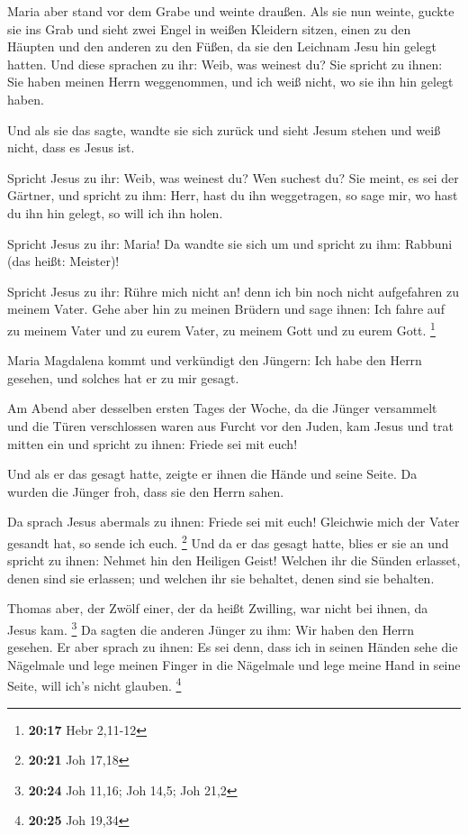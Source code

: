  Maria aber stand vor dem Grabe und weinte draußen. Als
sie nun weinte, guckte sie ins Grab  und sieht zwei Engel
in weißen Kleidern sitzen, einen zu den Häupten und den anderen zu den
Füßen, da sie den Leichnam Jesu hin gelegt hatten.  Und
diese sprachen zu ihr: Weib, was weinest du? Sie spricht zu ihnen: Sie
haben meinen Herrn weggenommen, und ich weiß nicht, wo sie ihn hin
gelegt haben.

 Und als sie das sagte, wandte sie sich zurück und sieht
Jesum stehen und weiß nicht, dass es Jesus ist.

 Spricht Jesus zu ihr: Weib, was weinest du? Wen suchest
du? Sie meint, es sei der Gärtner, und spricht zu ihm: Herr, hast du ihn
weggetragen, so sage mir, wo hast du ihn hin gelegt, so will ich ihn
holen.

 Spricht Jesus zu ihr: Maria! Da wandte sie sich um und
spricht zu ihm: Rabbuni (das heißt: Meister)!

 Spricht Jesus zu ihr: Rühre mich nicht an! denn ich bin
noch nicht aufgefahren zu meinem Vater. Gehe aber hin zu meinen Brüdern
und sage ihnen: Ich fahre auf zu meinem Vater und zu eurem Vater, zu
meinem Gott und zu eurem Gott. \footnote{\textbf{20:17} Hebr 2,11-12}

 Maria Magdalena kommt und verkündigt den Jüngern: Ich
habe den Herrn gesehen, und solches hat er zu mir gesagt.

 Am Abend aber desselben ersten Tages der Woche, da die
Jünger versammelt und die Türen verschlossen waren aus Furcht vor den
Juden, kam Jesus und trat mitten ein und spricht zu ihnen: Friede sei
mit euch!

 Und als er das gesagt hatte, zeigte er ihnen die Hände
und seine Seite. Da wurden die Jünger froh, dass sie den Herrn sahen.

 Da sprach Jesus abermals zu ihnen: Friede sei mit euch!
Gleichwie mich der Vater gesandt hat, so sende ich euch. \footnote{\textbf{20:21}
  Joh 17,18}  Und da er das gesagt hatte, blies er sie an
und spricht zu ihnen: Nehmet hin den Heiligen Geist! 
Welchen ihr die Sünden erlasset, denen sind sie erlassen; und welchen
ihr sie behaltet, denen sind sie behalten.

 Thomas aber, der Zwölf einer, der da heißt Zwilling, war
nicht bei ihnen, da Jesus kam. \footnote{\textbf{20:24} Joh 11,16; Joh
  14,5; Joh 21,2}  Da sagten die anderen Jünger zu ihm:
Wir haben den Herrn gesehen. Er aber sprach zu ihnen: Es sei denn, dass
ich in seinen Händen sehe die Nägelmale und lege meinen Finger in die
Nägelmale und lege meine Hand in seine Seite, will ich's nicht glauben.
\footnote{\textbf{20:25} Joh 19,34}

